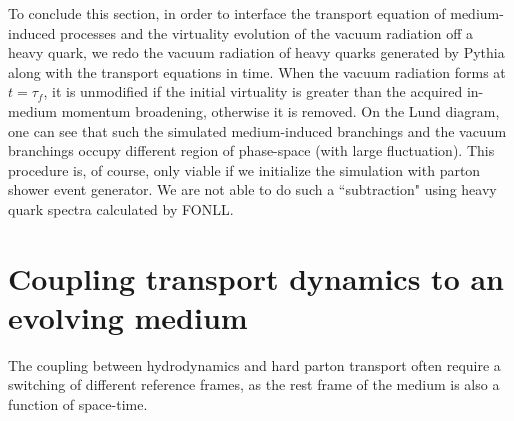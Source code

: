 To conclude this section, in order to interface the transport equation of medium-induced processes and the virtuality evolution of the vacuum radiation off a heavy quark, we redo the vacuum radiation of heavy quarks generated by Pythia along with the transport equations in time.
When the vacuum radiation forms at $t=\tau_f$, it is unmodified if the initial virtuality is greater than the acquired in-medium momentum broadening, otherwise it is removed.
On the Lund diagram, one can see that such the simulated medium-induced branchings and the vacuum branchings occupy different region of phase-space (with large fluctuation).
This procedure is, of course, only viable if we initialize the simulation with parton shower event generator.
We are not able to do such a ``subtraction" using heavy quark spectra calculated by FONLL.
 


\section{Coupling transport dynamics to an evolving medium}
The coupling between hydrodynamics and hard parton transport often require a switching of different reference frames, as the rest frame of the medium is also a function of space-time.
